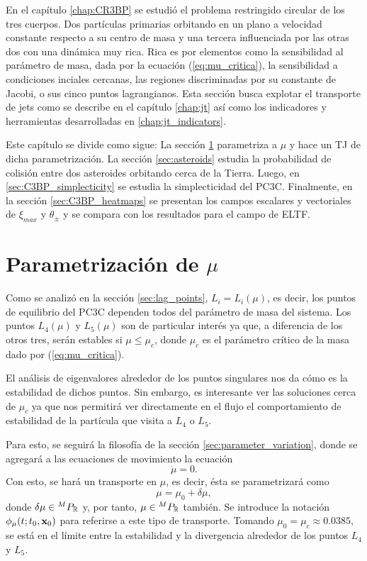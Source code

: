 En el capítulo \ref{chap:CR3BP} se estudió el problema restringido circular de los tres cuerpos. Dos partículas primarias orbitando en un plano a velocidad constante respecto a su centro de masa y una tercera influenciada por las otras dos con una dinámica muy rica. Rica es por elementos como la sensibilidad al parámetro de masa, dada por la ecuación (\ref{eq:mu_critica}), la sensibilidad a condiciones inciales cercanas, las regiones discriminadas por su constante de Jacobi, o sus cinco puntos lagrangianos. Esta sección busca explotar el transporte de jets como se describe en el capítulo \ref{chap:jt} así como los indicadores y herramientas desarrolladas en \ref{chap:jt_indicators}.


Este capítulo se divide como sigue: La sección \ref{sec:parametrization} parametriza a $\mu$ y hace un TJ de dicha parametrización. La sección \ref{sec:asteroids} estudia la probabilidad de colisión entre dos asteroides orbitando cerca de la Tierra. Luego, en \ref{sec:C3BP_simplecticity} se estudia la simplecticidad del PC3C. Finalmente, en la sección \ref{sec:C3BP_heatmaps} se presentan los campos escalares y vectoriales de $\xi_{max}$ y $\theta_{\pm}$ y se compara con los resultados para el campo de ELTF.

\section{Parametrización de $\mu$}
\label{sec:parametrization}

Como se analizó en la sección \ref{sec:lag_points}, $L_i = L_i(\mu)$, es decir, los puntos de equilibrio del PC3C dependen todos del parámetro de masa del sistema. Los puntos $L_4(\mu)$ y $L_5(\mu)$ son de particular interés ya que, a diferencia de los otros tres, serán estables si $\mu \leq \mu_c$, donde $\mu_c$ es el parámetro crítico de la masa dado por (\ref{eq:mu_critica}). 

El análisis de eigenvalores alrededor de los puntos singulares nos da cómo es la estabilidad de dichos puntos. Sin embargo, es interesante ver las soluciones cerca de $\mu_c$ ya que nos permitirá ver directamente en el flujo el comportamiento de estabilidad de la partícula que visita a $L_4$ o $L_5$.

Para esto, se seguirá la filosofía de la sección \ref{sec:parameter_variation}, donde se agregará a las ecuaciones de movimiento la ecuación 
\begin{equation*}
 \dot{\mu} = 0.
\end{equation*}
Con esto, se hará un transporte en $\mu$, es decir, ésta se parametrizará como 
\begin{equation*}
 \mu = \mu_0 + \delta\mu,
\end{equation*}   
donde $\delta\mu \in {^{M}P_{\mathbb{R}}}$ y, por tanto, $\mu \in {^{M}P_{\mathbb{R}}}$ también. Se introduce la notación $\phi_\mu(t;t_0,\mathbf{x}_0)$ para referirse a este tipo de transporte. Tomando $\mu_0 = \mu_c \approx 0.0385$, se está en el límite entre la estabilidad y la divergencia alrededor de los puntos $L_4$ y $L_5$.

